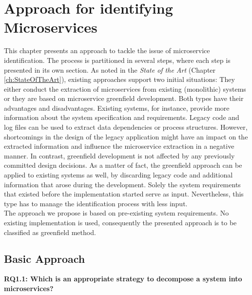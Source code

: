 \chapter{Approach for identifying Microservices}
\label{ch:Solution}
This chapter presents an approach to tackle the issue of microservice identification. The process is partitioned in several steps, where each step is presented in its own section.
As noted in the \textit{State of the Art} (Chapter \ref{ch:StateOfTheArt}), existing approaches support two initial situations: They either conduct the extraction of microservices from existing (monolithic) systems or they are based on microservice greenfield development. Both types have their advantages and disadvantages. Existing systems, for instance, provide more information about the system specification and requirements. Legacy code and log files can be used to extract data dependencies or process structures. However, shortcomings in the design of the legacy application might have an impact on the extracted information and influence the microservice extraction in a negative manner. In contrast, greenfield development is not affected by any previously committed design decisions. As a matter of fact, the greenfield approach can be applied to existing systems as well, by discarding legacy code and additional information that arose during the development. Solely the system requirements that existed before the implementation started serve as input. Nevertheless, this type has to manage the identification process with less input.\\
The approach we propose is based on pre-existing system requirements. No existing implementation is used, consequently the presented approach is to be classified as greenfield method.\\



\section{Basic Approach}


\vspace{0.5cm}
\par
\begingroup
\leftskip=1cm
\rightskip=1cm

\noindent
\textbf{RQ1.1: Which is an appropriate strategy to decompose a system into microservices? }

\endgroup
\vspace{0.5cm}




